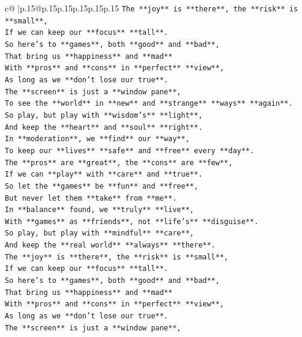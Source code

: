 \documentclass{article}
\begin{document}
{\begin{supertabular}{c@{$\;$}|p{.15\linewidth}@{}p{.15\linewidth}p{.15\linewidth}p{.15\linewidth}p{.15\linewidth}p{.15\linewidth}}
{{{\texttt{The **joy** is **there**, the **risk** is **small**,} \\
\texttt{If we can keep our **focus** **tall**.} \\
\texttt{So here's to **games**, both **good** and **bad**,} \\
\texttt{That bring us **happiness** and **mad**} \\
\texttt{With **pros** and **cons** in **perfect** **view**,} \\
\texttt{As long as we **don't lose our true**.} \\
\texttt{The **screen** is just a **window pane**,} \\
\texttt{To see the **world** in **new** and **strange** **ways** **again**.} \\
\texttt{So play, but play with **wisdom's** **light**,} \\
\texttt{And keep the **heart** and **soul** **right**.} \\
\texttt{In **moderation**, we **find** our **way**,} \\
\texttt{To keep our **lives** **safe** and **free** every **day**.} \\
\texttt{The **pros** are **great**, the **cons** are **few**,} \\
\texttt{If we can **play** with **care** and **true**.} \\
\texttt{So let the **games** be **fun** and **free**,} \\
\texttt{But never let them **take** from **me**.} \\
\texttt{In **balance** found, we **truly** **live**,} \\
\texttt{With **games** as **friends**, not **life's** **disguise**.} \\
\texttt{So play, but play with **mindful** **care**,} \\
\texttt{And keep the **real world** **always** **there**.} \\
\texttt{The **joy** is **there**, the **risk** is **small**,} \\
\texttt{If we can keep our **focus** **tall**.} \\
\texttt{So here's to **games**, both **good** and **bad**,} \\
\texttt{That bring us **happiness** and **mad**} \\
\texttt{With **pros** and **cons** in **perfect** **view**,} \\
\texttt{As long as we **don't lose our true**.} \\
\texttt{The **screen** is just a **window pane**,} \\
}}}
\end{supertabular}}
\end{document}
